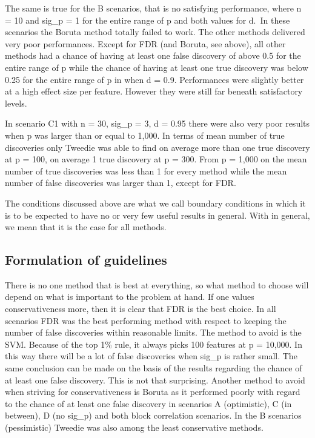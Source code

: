 \documentclass[
]{article}
\begin{document}
The same is true for the B scenarios, that is no satisfying performance, where n = 10 and sig\_p = 1 for the entire range of p and both values for d.~In these scenarios the Boruta method totally failed to work. The other methods delivered very poor performances. Except for FDR (and Boruta, see above), all other methods had a chance of having at least one false discovery of above 0.5 for the entire range of p while the chance of having at least one true discovery was below 0.25 for the entire range of p in when d = 0.9. Performances were slightly better at a high effect size per feature. However they were still far beneath satisfactory levels.

In scenario C1 with n = 30, sig\_p = 3, d = 0.95 there were also very poor results when p was larger than or equal to 1,000. In terms of mean number of true discoveries only Tweedie was able to find on average more than one true discovery at p = 100, on average 1 true discovery at p = 300. From p = 1,000 on the mean number of true discoveries was less than 1 for every method while the mean number of false discoveries was larger than 1, except for FDR.

The conditions discussed above are what we call boundary conditions in which it is to be expected to have no or very few useful results in general. With in general, we mean that it is the case for all methods.

\hypertarget{formulation-of-guidelines}{%
\subsection{Formulation of guidelines}\label{formulation-of-guidelines}}

There is no one method that is best at everything, so what method to choose will depend on what is important to the problem at hand. If one values conservativeness more, then it is clear that FDR is the best choice. In all scenarios FDR was the best performing method with respect to keeping the number of false discoveries within reasonable limits. The method to avoid is the SVM. Because of the top 1\% rule, it always picks 100 features at p = 10,000. In this way there will be a lot of false discoveries when sig\_p is rather small. The same conclusion can be made on the basis of the results regarding the chance of at least one false discovery. This is not that surprising. Another method to avoid when striving for conservativeness is Boruta as it performed poorly with regard to the chance of at least one false discovery in scenarios A (optimistic), C (in between), D (no sig\_p) and both block correlation scenarios. In the B scenarios (pessimistic) Tweedie was also among the least conservative methods.
\end{document}
